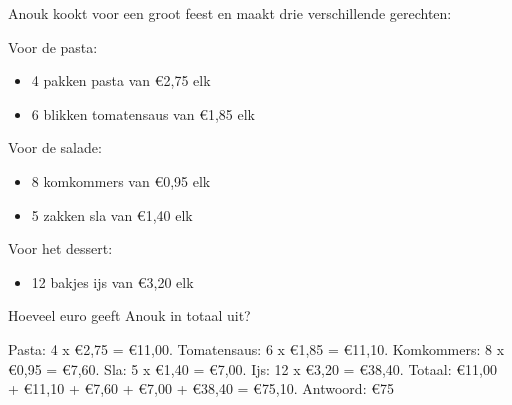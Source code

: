 \begin{opgave}
Anouk kookt voor een groot feest en maakt drie verschillende gerechten:

Voor de pasta:
\begin{itemize}
\item 4 pakken pasta van €2,75 elk
\item 6 blikken tomatensaus van €1,85 elk
\end{itemize}

Voor de salade:
\begin{itemize}
\item 8 komkommers van €0,95 elk
\item 5 zakken sla van €1,40 elk
\end{itemize}

Voor het dessert:
\begin{itemize}
\item 12 bakjes ijs van €3,20 elk
\end{itemize}

Hoeveel euro geeft Anouk in totaal uit?
\end{opgave}

\begin{oplossing}
Pasta: 4 x €2,75 = €11,00.
Tomatensaus: 6 x €1,85 = €11,10.
Komkommers: 8 x €0,95 = €7,60.
Sla: 5 x €1,40 = €7,00.
Ijs: 12 x €3,20 = €38,40.
Totaal: €11,00 + €11,10 + €7,60 + €7,00 + €38,40 = €75,10.
Antwoord: €75
\end{oplossing}